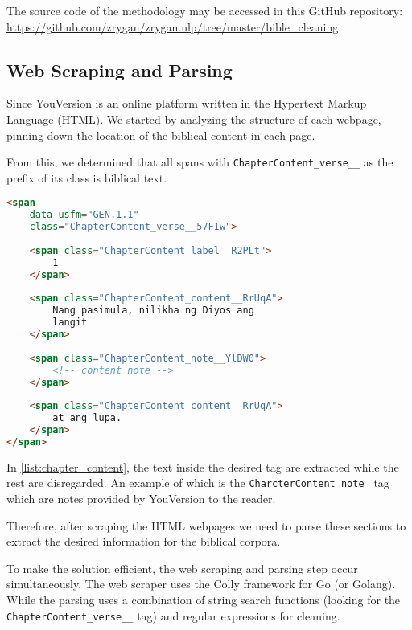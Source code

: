 \documentclass{article}
\begin{document}
The source code of the methodology may be accessed in this GitHub repository:
\url{https://github.com/zrygan/zrygan.nlp/tree/master/bible_cleaning}

\subsection{Web Scraping and Parsing}


Since YouVersion is an online platform written in the Hypertext Markup Language
(HTML). We started by analyzing the structure of each webpage, pinning down the
location of the biblical content in each page.

From this, we determined that all spans with \texttt{ChapterContent\_verse\_\_}
as the prefix of its class is biblical text.

\begin{lstlisting}[language=HTML, caption={\texttt{ChapterContent\_verse\_\_} tag}, label={list:chapter_content}]
<span 
    data-usfm="GEN.1.1"
    class="ChapterContent_verse__57FIw">
    
    <span class="ChapterContent_label__R2PLt">
        1
    </span>
    
    <span class="ChapterContent_content__RrUqA">
        Nang pasimula, nilikha ng Diyos ang
        langit
    </span>
    
    <span class="ChapterContent_note__YlDW0">
        <!-- content note -->
    </span>
    
    <span class="ChapterContent_content__RrUqA">
        at ang lupa.
    </span>
</span>
\end{lstlisting}

In \cref{list:chapter_content}, the text inside the desired tag are extracted
while the rest are disregarded. An example of which is the
\texttt{CharcterContent\_note\_} tag which are notes provided by YouVersion to
the reader.

Therefore, after scraping the HTML webpages we need to parse these sections to
extract the desired information for the biblical corpora.

To make the solution efficient, the web scraping and parsing step occur
simultaneously. The web scraper uses the Colly framework for Go (or Golang).
While the parsing uses a combination of string search functions (looking for
the \texttt{ChapterContent\_verse\_\_} tag) and regular expressions for
cleaning.
\end{document}
